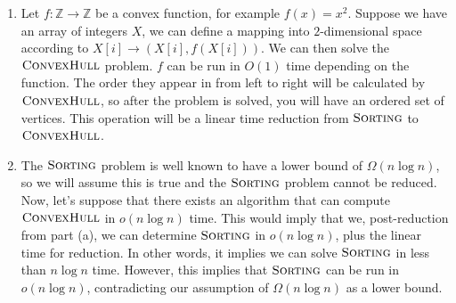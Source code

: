 \documentclass{article}
\begin{document}
\begin{solution}
\begin{enumerate}[label = (\alph*)]
    \item Let $f: \mathbb{Z} \to \mathbb{Z}$ be a convex function, for example $f(x) = x^2$. Suppose we have an array of integers $X$, we can define a mapping into $2$-dimensional space according to $X[i] \to \left( X[i], f(X[i])\right)$. We can then solve the $\mathsf{\textsc{ConvexHull}}$ problem. $f$ can be run in $O(1)$ time depending on the function. The order they appear in from left to right will be calculated by $\mathsf{\textsc{ConvexHull}}$, so after the problem is solved, you will have an ordered set of vertices. This operation will be a linear time reduction from $\mathsf{\textsc{Sorting}}$ to $\mathsf{\textsc{ConvexHull}}$.

\item The  $\mathsf{\textsc{Sorting}}$ problem is well known to have a lower bound of $\Omega(n \log n)$, so we will assume this is true and the  $\mathsf{\textsc{Sorting}}$ problem cannot be reduced. Now, let's suppose that there exists an algorithm that can compute $\mathsf{\textsc{ConvexHull}}$ in $o(n \log n)$ time. This would imply that we, post-reduction from part (a), we can determine  $\mathsf{\textsc{Sorting}}$ in $o(n \log n)$, plus the linear time for reduction. In other words, it implies we can solve $\mathsf{\textsc{Sorting}}$ in less than $n \log n$ time. However, this implies that $\mathsf{\textsc{Sorting}}$ can be run in $o(n \log n)$, contradicting our assumption of $\Omega(n \log n)$ as a lower bound.
\end{enumerate}
\end{solution}
\end{document}

